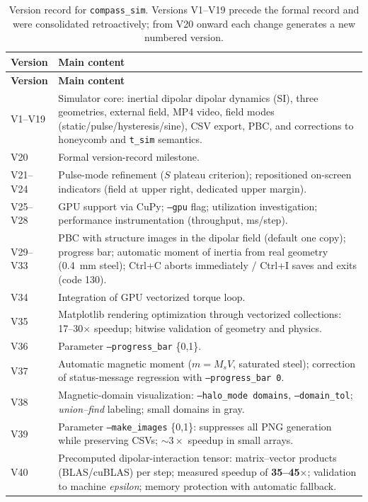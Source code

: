 \documentclass[11pt,a4paper]{article}
\newcommand{\code}[1]{\texttt{#1}}
\begin{document}
\begin{longtable}{@{}lp{11.5cm}@{}}
\caption{Version record for \code{compass\_sim}. Versions V1--V19 precede the formal record and were consolidated retroactively; from V20 onward each change generates a new numbered version.}
\label{tab:versoes} \\
\toprule
\textbf{Version} & \textbf{Main content} \\
\midrule
\endfirsthead
\toprule
\textbf{Version} & \textbf{Main content} \\
\midrule
\endhead
\bottomrule
\endfoot
\bottomrule
\endlastfoot
V1--V19 & Simulator core: inertial dipolar dipolar dynamics (SI), three geometries, external field, MP4 video, field modes (static/pulse/hysteresis/sine), CSV export, PBC, and corrections to honeycomb and \code{t\_sim} semantics. \\
V20 & Formal version-record milestone. \\
V21--V24 & Pulse-mode refinement ($S$ plateau criterion); repositioned on-screen indicators (field at upper right, dedicated upper margin). \\
V25--V28 & GPU support via CuPy; \code{--gpu} flag; utilization investigation; performance instrumentation (throughput, ms/step). \\
V29--V33 & PBC with structure images in the dipolar field (default one copy); progress bar; automatic moment of inertia from real geometry (\SI{0.4}{mm} steel); Ctrl+C aborts immediately / Ctrl+I saves and exits (code 130). \\
V34 & Integration of GPU vectorized torque loop. \\
V35 & Matplotlib rendering optimization through vectorized collections: 17--30$\times$ speedup; bitwise validation of geometry and physics. \\
V36 & Parameter \code{--progress\_bar} \{0,1\}. \\
V37 & Automatic magnetic moment ($m = M_s V$, saturated steel); correction of status-message regression with \code{--progress\_bar 0}. \\
V38 & Magnetic-domain visualization: \code{--halo\_mode domains}, \code{--domain\_tol}; \emph{union--find} labeling; small domains in gray. \\
V39 & Parameter \code{--make\_images} \{0,1\}: suppresses all PNG generation while preserving CSVs; $\sim 3\times$ speedup in small arrays. \\
V40 & Precomputed dipolar-interaction tensor: matrix--vector products (BLAS/cuBLAS) per step; measured speedup of \textbf{35--45$\times$}; validation to machine \emph{epsilon}; memory protection with automatic fallback. \\

\end{longtable}
\end{document}
